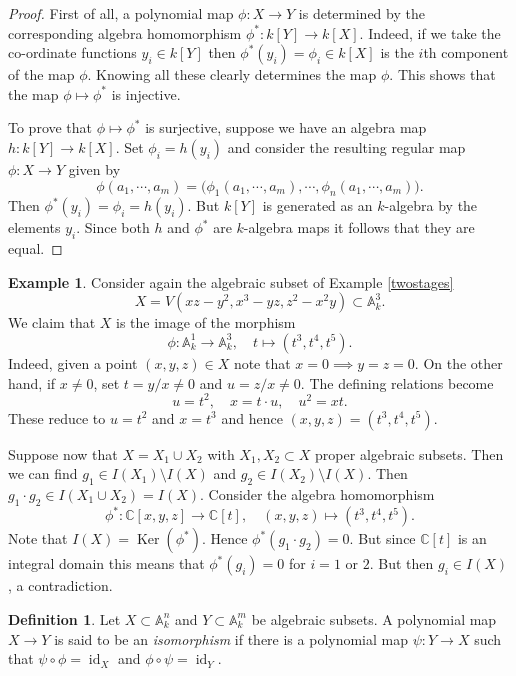\documentclass [12pt,oneside,a4paper,mathscr]{amsart}
\theoremstyle{definition}
\newtheorem{defn}[thm]{Definition}
\newtheorem{example}[thm]{Example}
\newcommand {\A}{\mathbb A}
\newcommand {\C}{\mathbb C}
\newcommand {\id}{\operatorname{id}}
\renewcommand{\ker}{\operatorname{Ker}}
\begin{document}
\begin{proof}
First of all, a polynomial map $\phi\colon X \to Y$ is determined by the corresponding algebra homomorphism $\phi^*\colon k[Y]\to k[X]$. Indeed, if we take the co-ordinate functions $y_i\in k[Y]$ then $\phi^*(y_i)=\phi_i\in k[X]$ is the $i$th component of the map $\phi$. Knowing all these clearly determines  the map $\phi$. This shows that the map $\phi\mapsto \phi^*$ is injective.

To prove that $\phi\mapsto \phi^*$ is surjective, suppose we have an algebra map $h\colon k[Y]\to k[X]$. Set $\phi_i=h(y_i)$ and consider the resulting regular map $\phi\colon X \to Y$ given by
\[\phi(a_1, \cdots, a_m)=\big(\phi_1(a_1,\cdots, a_m), \cdots, \phi_{n}(a_1,\cdots, a_m)\big).\]
Then $\phi^*(y_i)=\phi_i=h(y_i)$. But $k[Y]$ is generated as an $k$-algebra by the elements $y_i$. Since both $h$ and $\phi^*$ are $k$-algebra maps it follows that they are  equal.
\end{proof}

\begin{example}
\label{secondstage}
Consider again the algebraic subset of Example \ref{twostages}
\[X=V(xz-y^2,x^3-yz,z^2-x^2y)\subset \A^3_k.\]
We claim that $X$ is the image of the morphism
\[\phi\colon \A^1_k \to \A^3_k, \quad  t\mapsto (t^3,t^4,t^5).\]
Indeed, given a point $(x,y,z)\in X$ note that $x=0 \implies y=z=0$. On the other hand, if $x\neq 0$, set $t=y/x\neq 0$ and $u=z/x\neq 0$. The defining relations become
\[u=t^2, \quad x=t\cdot u, \quad  u^2=xt.\]
These reduce to $u=t^2$ and $x=t^3$ and hence $(x,y,z)=(t^3,t^4,t^5)$. 

Suppose now that $X=X_1\cup X_2$ with $X_1,X_2\subset X$ proper algebraic subsets. Then we can find $g_1\in I(X_1)\setminus I(X)$ and $g_2\in I(X_2)\setminus I(X)$. Then $g_1\cdot g_2\in I(X_1\cup X_2)=I(X)$.
Consider the algebra homomorphism
\[\phi^*\colon \C[x,y,z]\to \C[t], \quad (x,y,z)\mapsto (t^3,t^4,t^5).\]
Note that $I(X)=\ker(\phi^*)$. Hence $\phi^*(g_1\cdot g_2)=0$. But since $\C[t]$ is an integral domain this means that  $\phi^*(g_i)=0$ for $i=1$ or $2$. But then $g_i\in I(X)$, a contradiction.
\end{example}

\begin{defn}
Let $X\subset \A^n_k$ and $Y\subset \A^m_k$ be algebraic subsets. A polynomial map $X\to Y$ is said to be an \emph{isomorphism} if there is a polynomial map $\psi\colon Y\to X$ such that $\psi\circ \phi=\id_X$ and $\phi\circ \psi=\id_Y$.
\end{defn}
\end{document}

